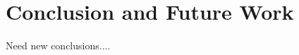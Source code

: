 \section{Conclusion and Future Work}
\label{sec:conclusion}

{\color{red} Need new conclusions....}

